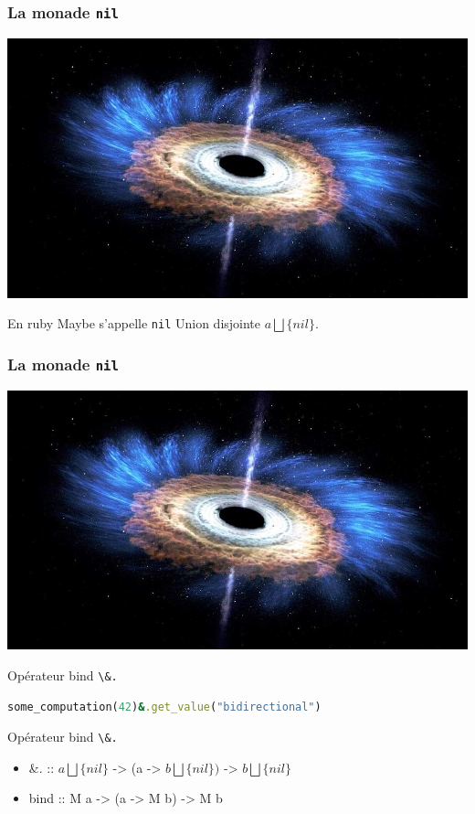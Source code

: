 \documentclass{beamer}
\begin{document}
{
\begin{frame}
  \frametitle{La monade \verb!nil!}
  \begin{center}
    \includegraphics[scale=0.8]{blackhole}
  \end{center}
  \begin{alertblock}{En ruby Maybe s'appelle \verb!nil!}
  Union disjointe $a \bigsqcup \{nil\}$.
  \end{alertblock}
\end{frame}
}
{
\begin{frame}[fragile]
  \frametitle{La monade \verb!nil!}
  \begin{center}
    \includegraphics[scale=0.4]{blackhole}
  \end{center}
  \begin{block}{Opérateur bind \verb!\&.!}
    \begin{lstlisting}[language=ruby]
some_computation(42)&.get_value("bidirectional")
    \end{lstlisting}
  \end{block}
  \begin{block}{Opérateur bind \verb!\&.!}
  \begin{itemize}
  \item  \&. :: $a \bigsqcup \{nil\}$ -> (a -> $b \bigsqcup \{nil\})$ -> $b \bigsqcup \{nil\}$
  \item bind :: M a -> (a -> M b) -> M b
  \end{itemize}
  
  \end{block}
\end{frame}
}
\end{document}
